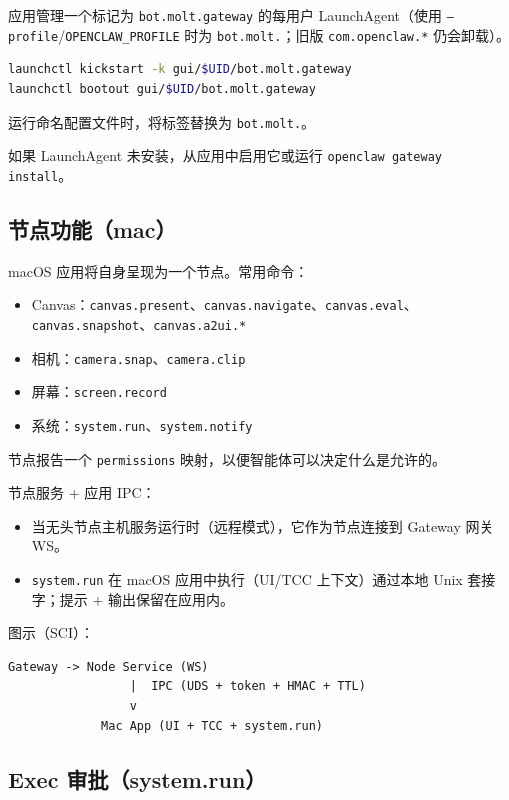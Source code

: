 应用管理一个标记为 \texttt{bot.molt.gateway} 的每用户 LaunchAgent（使用 \texttt{--profile}/\texttt{OPENCLAW\_PROFILE} 时为 \texttt{bot.molt.}；旧版 \texttt{com.openclaw.*} 仍会卸载）。

\begin{lstlisting}[language=bash]
launchctl kickstart -k gui/$UID/bot.molt.gateway
launchctl bootout gui/$UID/bot.molt.gateway
\end{lstlisting}


运行命名配置文件时，将标签替换为 \texttt{bot.molt.}。

如果 LaunchAgent 未安装，从应用中启用它或运行 \texttt{openclaw gateway install}。

\subsection{节点功能（mac）}


macOS 应用将自身呈现为一个节点。常用命令：

\begin{itemize}
  \item Canvas：\texttt{canvas.present}、\texttt{canvas.navigate}、\texttt{canvas.eval}、\texttt{canvas.snapshot}、\texttt{canvas.a2ui.*}
  \item 相机：\texttt{camera.snap}、\texttt{camera.clip}
  \item 屏幕：\texttt{screen.record}
  \item 系统：\texttt{system.run}、\texttt{system.notify}
\end{itemize}


节点报告一个 \texttt{permissions} 映射，以便智能体可以决定什么是允许的。

节点服务 + 应用 IPC：

\begin{itemize}
  \item 当无头节点主机服务运行时（远程模式），它作为节点连接到 Gateway 网关 WS。
  \item \texttt{system.run} 在 macOS 应用中执行（UI/TCC 上下文）通过本地 Unix 套接字；提示 + 输出保留在应用内。
\end{itemize}


图示（SCI）：

\begin{lstlisting}
Gateway -> Node Service (WS)
                 |  IPC (UDS + token + HMAC + TTL)
                 v
             Mac App (UI + TCC + system.run)
\end{lstlisting}


\subsection{Exec 审批（system.run）}


